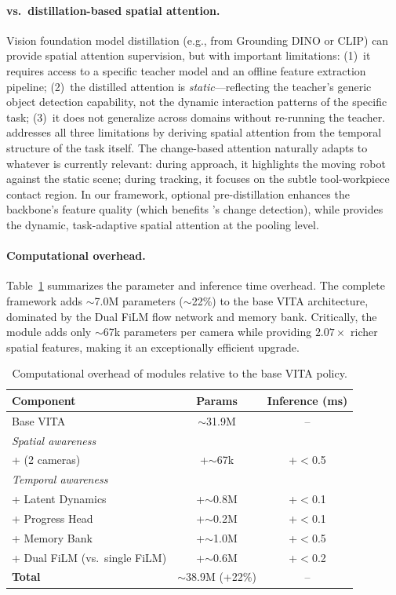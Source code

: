 \paragraph{\fasa{} vs.\ distillation-based spatial attention.} Vision foundation model distillation (e.g., from Grounding DINO or CLIP) can provide spatial attention supervision, but with important limitations: (1)~it requires access to a specific teacher model and an offline feature extraction pipeline; (2)~the distilled attention is \emph{static}---reflecting the teacher's generic object detection capability, not the dynamic interaction patterns of the specific task; (3)~it does not generalize across domains without re-running the teacher. \fasa{} addresses all three limitations by deriving spatial attention from the temporal structure of the task itself. The change-based attention naturally adapts to whatever is currently relevant: during approach, it highlights the moving robot against the static scene; during tracking, it focuses on the subtle tool-workpiece contact region. In our framework, optional pre-distillation enhances the backbone's feature quality (which benefits \fasa{}'s change detection), while \fasa{} provides the dynamic, task-adaptive spatial attention at the pooling level.

\paragraph{Computational overhead.} Table~\ref{tab:compute} summarizes the parameter and inference time overhead. The complete \method{} framework adds $\sim$7.0M parameters ($\sim$22\%) to the base VITA architecture, dominated by the Dual FiLM flow network and memory bank. Critically, the \fasa{} module adds only $\sim$67k parameters per camera while providing $2.07\times$ richer spatial features, making it an exceptionally efficient upgrade.

\begin{table}[t]
\centering
\caption{Computational overhead of \method{} modules relative to the base VITA policy.}
\label{tab:compute}
\begin{tabular}{lcc}
\toprule
\textbf{Component} & \textbf{Params} & \textbf{Inference (ms)} \\
\midrule
Base VITA & $\sim$31.9M & -- \\
\midrule
\multicolumn{3}{l}{\textit{Spatial awareness}} \\
\quad + \fasa{} (2 cameras) & +$\sim$67k & +$<$0.5 \\
\midrule
\multicolumn{3}{l}{\textit{Temporal awareness}} \\
\quad + Latent Dynamics & +$\sim$0.8M & +$<$0.1 \\
\quad + Progress Head & +$\sim$0.2M & +$<$0.1 \\
\quad + Memory Bank & +$\sim$1.0M & +$<$0.5 \\
\quad + Dual FiLM (vs.\ single FiLM) & +$\sim$0.6M & +$<$0.2 \\
\midrule
\textbf{Total \method{}} & $\sim$38.9M (+22\%) & -- \\
\bottomrule
\end{tabular}
\end{table}

